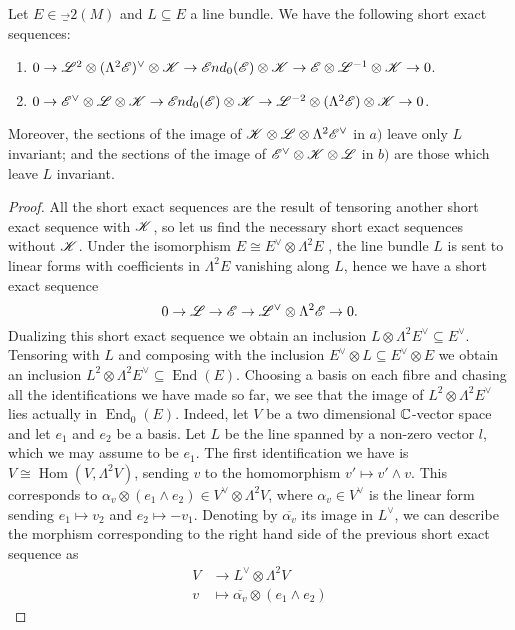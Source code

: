 \documentclass[A4paper, 12pt, british, reqno]{amsart}
\DeclareMathOperator{\Hom}{Hom}
\DeclareMathOperator{\End}{End}
\newcommand{\ot}{\otimes}
\newcommand{\dual}{^{\vee}}
\begin{document}
\begin{lm}\label{lm:linearalgebra}
    Let $E\in \Vec_{2}(M)$ and $L\subseteq E$ a line bundle.
    We have the following short exact sequences:
    \begin{enumerate}[label=\alph*)]
	\item $0\to \L^{2}\ot (\Lambda^{2}\E)\dual \ot \sK \to \sEnd_{0}(\E)\ot \sK\to \E\ot \L^{-1}\ot \sK\to 0$.
	\item $0\to \E\dual \ot \L\ot \sK\to \sEnd_{0}(\E)\ot \sK \to \L^{-2}\ot (\Lambda^{2}\E)\ot \sK\to 0$.
    \end{enumerate}
    Moreover, the sections of the image of $\sK\ot \L\ot \Lambda^{2}\E\dual$ in $a)$ leave only $L$ invariant; and the sections of the image of $\E\dual\ot \sK\ot\L$ in $b)$ are those which leave $L$ invariant.
    \color{gray}
    \begin{proof}
	All the short exact sequences are the result of tensoring another short exact sequence with $\mathscr{K}$, so let us find the necessary short exact sequences without $\mathscr{K}$.
	Under the isomorphism $E\cong E\dual \ot \Lambda^{2}E$ \cite[Exercise II.5.16]{har77}, the line bundle $L$ is sent to linear forms with coefficients in $\Lambda^{2}E$ vanishing along $L$, hence we have a short exact sequence
	\[ 0\to \L\to \E\to \L\dual \ot \Lambda^{2}\E\to 0. \]
	Dualizing this short exact sequence we obtain an inclusion $L\ot \Lambda^{2}E\dual \subseteq E\dual$.
	Tensoring with $L$ and composing with the inclusion $E\dual\ot L\subseteq E\dual \ot E$ we obtain an inclusion $L^{2}\ot \Lambda^{2}E\dual \subseteq \End(E)$.
	Choosing a basis on each fibre and chasing all the identifications we have made so far, we see that the image of $L^{2}\ot \Lambda^{2}E\dual$ lies actually in $\End_{0}(E)$.
	Indeed, let $V$ be a two dimensional $\mathbb{C}$-vector space and let $e_{1}$ and $e_{2}$ be a basis.
	Let $L$ be the line spanned by a non-zero vector $l$, which we may assume to be $e_{1}$.
	The first identification we have is $V\cong \Hom(V,\Lambda^{2}V)$, sending $v$ to the homomorphism $v'\mapsto v'\wedge v$.
	This corresponds to $\alpha_{v}\ot (e_{1}\wedge e_{2})\in V\dual\ot\Lambda^{2}V$, where $\alpha_{v}\in V\dual$ is the linear form sending $e_{1}\mapsto v_{2}$ and $e_{2}\mapsto -v_{1}$.
	Denoting by $\overline{\alpha_{v}}$ its image in $L\dual$, we can describe the morphism corresponding to the right hand side of the previous short exact sequence as
	\begin{align*}
	    V &\longrightarrow L\dual \ot \Lambda^{2}V \\
	    v &\longmapsto \overline{\alpha_{v}}\ot (e_{1}\wedge e_{2})

\end{align*}
\end{proof}
\end{lm}
\end{document}
